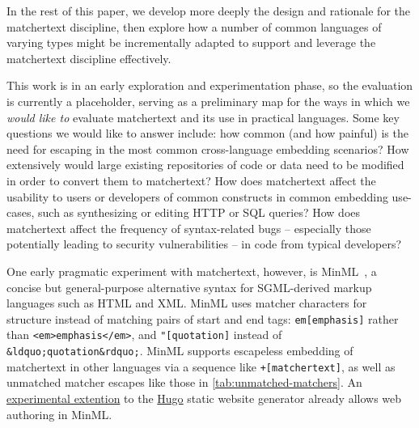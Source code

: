 In the rest of this paper, 
we develop more deeply the design and rationale for the matchertext discipline,
then explore how a number of common languages of varying types
might be incrementally adapted to support and leverage
the matchertext discipline effectively.

This work is in an early exploration and experimentation phase,
so the evaluation is currently a placeholder,
serving as a preliminary map for the ways in which
we \emph{would like to} evaluate matchertext
and its use in practical languages.
Some key questions we would like to answer include:
how common (and how painful) is the need for escaping
in the most common cross-language embedding scenarios?
How extensively would large existing repositories of code or data
need to be modified in order to convert them to matchertext?
How does matchertext affect the usability to users or developers
of common constructs in common embedding use-cases,
such as synthesizing or editing HTTP or SQL queries?
How does matchertext affect the frequency of syntax-related bugs --
especially those potentially leading to security vulnerabilities --
in code from typical developers?

One early pragmatic experiment with matchertext, however,
is MinML~\cite{ford22minml},
a concise but general-purpose alternative syntax
for SGML-derived markup languages such as HTML and XML.
MinML uses matcher characters for structure
instead of matching pairs of start and end tags:
\eg \verb|em[emphasis]| rather than \verb|<em>emphasis</em>|,
and \verb|"[quotation]| instead of \verb|&ldquo;quotation&rdquo;|.
MinML supports escapeless embedding of matchertext in other languages
via a sequence like \verb|+[matchertext]|,
as well as unmatched matcher escapes
like those in \cref{tab:unmatched-matchers}.
An \href{https://github.com/bford/hugo}{experimental extention}
to the \href{https://gohugo.io}{Hugo} static website generator
already allows web authoring in MinML.



